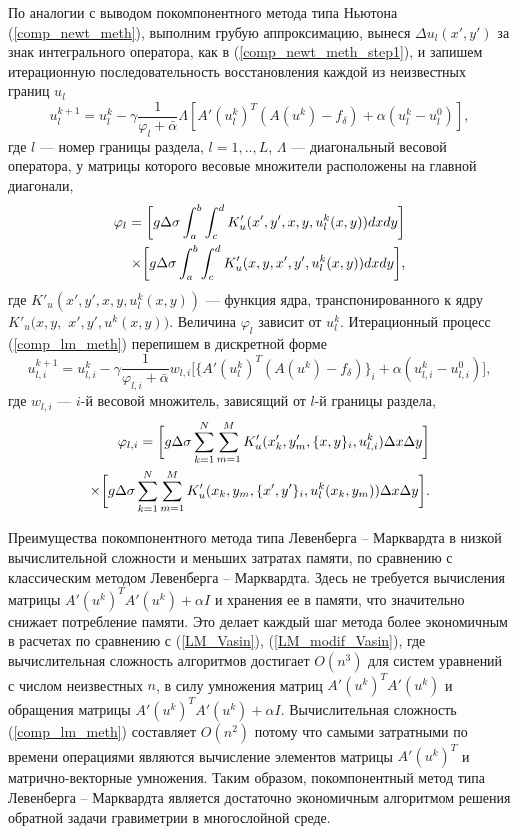По аналогии с выводом покомпонентного метода типа Ньютона (\ref{comp_newt_meth}), выполним грубую аппроксимацию, вынеся $\Delta u_l(x',y')$ за знак интегрального оператора, как в (\ref{comp_newt_meth_step1}), и запишем итерационную последовательность восстановления каждой из неизвестных границ $u_l$
\begin{equation}\label{comp_lm_meth}
u_l^{k+1}=u_l^k-\gamma\frac{1}{\varphi_l+\bar{\alpha}}\Lambda[ A'(u_l^k)^T(A(u^k)-f_\delta)+\alpha (u_l^k-u_l^0)],
\end{equation}
где $l$ --- номер границы раздела, $l=1,..,L$, $\Lambda$ --- диагональный весовой оператора, у матрицы которого весовые множители расположены на главной диагонали, 
\begin{equation*}
\begin{aligned}
\varphi_l=\bigg[ g\Delta\sigma\int_{a}^{b}\int_{c}^{d}
K'_u(x',y', x, y, u_l^k(x,y))dxdy\bigg] \notag \\ \times\bigg[g\Delta\sigma\int_{a}^{b}\int_{c}^{d}K'_u(x,y, x',y',u_l^k(x,y))dxdy\bigg], 
\end{aligned}
\end{equation*} 
где $K'_u(x',y', x, y, u_l^k(x,y))$ --- функция ядра, транспонированного к ядру $K'_u(x,y,$ $ x',y',u^k(x,y))$. Величина $\varphi_l$ зависит от $u_l^k$.
Итерационный процесс (\ref{comp_lm_meth}) перепишем в дискретной форме
\begin{equation}\label{comp_lm_meth_disc}
u_{l,i}^{k+1}=u_{l,i}^k-\gamma\frac{1}{\varphi_{l,i}+\bar{\alpha}}w_{l,i}\bigg[ \{A'(u_l^k)^T(A(u^k)-f_\delta)\}_i+\alpha (u_{l,i}^k-u_{l,i}^0)\bigg],
\end{equation}
где $w_{l,i}$ --- $i$-й весовой множитель, зависящий от $l$-й границы раздела,
\begin{equation*}
\begin{aligned}
\varphi_{l,i}=\bigg[ g\Delta\sigma\sum\limits_{k=1}^{N}
\sum\limits_{m=1}^{M}
K'_u(x'_k,y'_m, \{x, y\}_i, u_{l,i}^k) \Delta x \Delta y\bigg] \notag \\ \times\bigg[g\Delta\sigma\sum\limits_{k=1}^{N}
\sum\limits_{m=1}^{M}K'_u(x_k,y_m, \{x',y'\}_i,u_l^k(x_k,y_m))\Delta x \Delta y\bigg]. 
\end{aligned}
\end{equation*}

Преимущества покомпонентного метода типа Левенберга -- Марквардта в низкой вычислительной сложности и меньших затратах памяти, по сравнению с классическим методом Левенберга -- Марквардта. Здесь не требуется вычисления матрицы $A'(u^k)^T A'(u^k)+\alpha I$ и хранения ее в памяти, что значительно снижает потребление памяти. Это делает каждый шаг метода более экономичным в расчетах по сравнению с (\ref{LM_Vasin}), (\ref{LM_modif_Vasin}), где вычислительная сложность алгоритмов достигает $O(n^3)$ для систем уравнений с числом неизвестных $n$, в силу умножения матриц $A'(u^k)^T A'(u^k)$ и обращения матрицы $A'(u^k)^T A'(u^k)+\alpha I$. Вычислительная сложность (\ref{comp_lm_meth}) составляет $O(n^2)$ потому что самыми затратными по времени операциями являются вычисление элементов матрицы $A'(u^k)^T$ и матрично-векторные умножения. Таким образом, покомпонентный метод типа Левенберга -- Марквардта является достаточно экономичным алгоритмом решения обратной задачи гравиметрии в многослойной среде.

